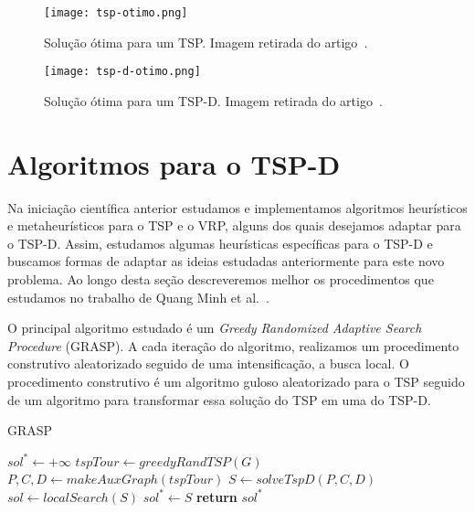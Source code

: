 \documentclass[12pt, a4paper]{article}
\begin{document}
\begin{figure}[htb!]
 \centering
 \begin{minipage}[c]{.49\linewidth}
  \centering
  \texttt{[image: tsp-otimo.png]}
  \caption{Solução ótima para um TSP. Imagem retirada do artigo~\cite{ha2018min}.}
  \label{fig:tsp}
 \end{minipage}\hfill
 \begin{minipage}[c]{.49\linewidth}
  \centering
  \texttt{[image: tsp-d-otimo.png]}
  \caption{Solução ótima para um TSP-D. Imagem retirada do artigo~\cite{ha2018min}.}
  \label{fig:tspd}
 \end{minipage}
\end{figure}


\section{Algoritmos para o TSP-D}\label{sec:algorithms}

Na iniciação científica anterior estudamos e implementamos algoritmos heurísticos e metaheurísticos para o TSP e o VRP, alguns dos quais desejamos adaptar para o TSP-D. Assim, estudamos algumas heurísticas específicas para o TSP-D e buscamos formas de adaptar as ideias estudadas anteriormente para este novo problema. Ao longo desta seção descreveremos melhor os procedimentos que estudamos no trabalho de Quang Minh et al.~\cite{ha2018min}.\par
O principal algoritmo estudado é um \textit{Greedy Randomized Adaptive Search Procedure} (GRASP). %
A cada iteração do algoritmo, realizamos um procedimento construtivo aleatorizado seguido de uma intensificação, a busca local. O procedimento construtivo é um algoritmo guloso aleatorizado para o TSP seguido de um algoritmo para transformar essa solução do TSP em uma do TSP-D.

\begin{algorithm}[htb!]
  \caption{GRASP}\label{alg:GRASP}
  \begin{algorithmic}[1]
      \State $sol^* \gets +\infty$
       \State $tspTour \gets greedyRandTSP(G)$
       \State $P, C, D \gets makeAuxGraph(tspTour)$
       \State $S \gets solveTspD(P, C, D)$
       \State $sol \gets localSearch(S)$ 
	      \State $sol^* \gets S$
	  \EndIf
      \EndWhile
      \State \textbf{return} $sol^*$
      \EndFunction
  \end{algorithmic}
\end{algorithm}
\end{document}
